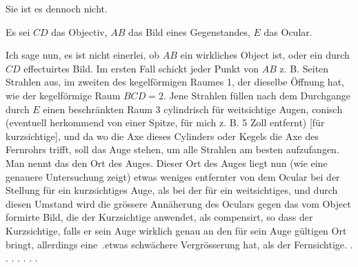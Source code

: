 Sie ist es dennoch nicht.
\begin{center}\DioptrikLetterTwentyTwoDiagram\end{center}
\noindent\hspace*{\parindent}Es sei $CD$ das Objectiv, $AB$ das Bild eines Gegenstandes, $E$ das Ocular.
\par\clearpage{}
\noindent Ich sage nun, es ist nicht einerlei, ob $AB$ ein wirkliches Object ist, oder ein durch $CD$ effectuirtes Bild. Im ersten Fall schickt jeder Punkt von $AB$ z. B.  Seiten Strahlen aus, im zweiten  des kegelförmigen Raumes 1, der dieselbe Öffnung hat, wie der kegelförmige Raum $BCD=2$. Jene Strahlen füllen nach dem Durchgange durch $E$ einen beschränkten Raum 3 cylindrisch für weitsichtige Augen, conisch (eventuell herkommend von einer Spitze, für mich z. B. 5 Zoll entfernt) [für kurzsichtige], und da wo die Axe dieses Cylinders oder Kegels die Axe des Fernrohrs trifft, soll das Auge stehen, um alle Strahlen am besten aufzufangen. Man nennt das den Ort des Auges. Dieser Ort des Auges liegt nun (wie eine genauere Untersuchung zeigt) etwas weniges entfernter von dem Ocular bei der Stellung für ein kurzsichtiges Auge, als bei der für ein weitsichtiges, und durch diesen Umstand wird die grössere Annäherung des Oculars gegen das vom Object formirte Bild, die der Kurzsichtige anwendet,  als compensirt, so dass der Kurzsichtige, falls er sein Auge wirklich genau an den für sein Auge gültigen Ort bringt, allerdings eine~.etwas schwächere Vergrösserung hat, als der Fernsichtige. . . . . . . .
\clearpage\endgroup

